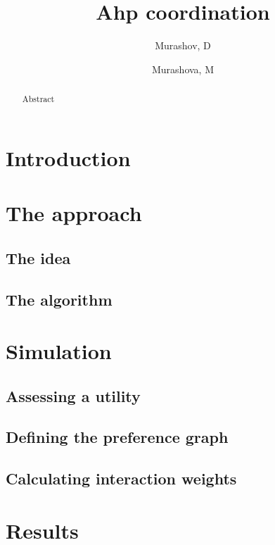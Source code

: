 \documentclass{article}
\author{Murashov, D \and Murashova, M}
\title{Ahp coordination}
\begin{document}
    \maketitle

    \begin{abstract}
        Abstract
    \end{abstract}

    \section{Introduction}

    

    \section{The approach}

    \subsection{The idea}

    

    \subsection{The algorithm}

    

    \section{Simulation}

    \subsection{Assessing a utility}

    

    \subsection{Defining the preference graph}

    

    \subsection{Calculating interaction weights}

    

    \section{Results}

    

    \medskip

    

    
\end{document}
